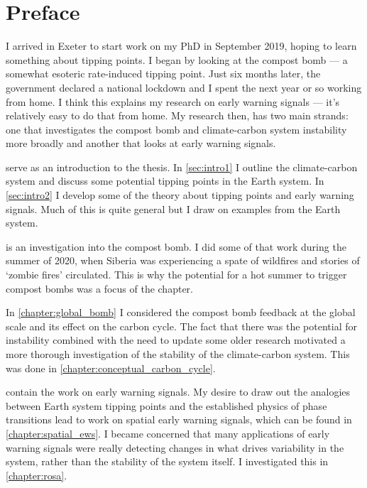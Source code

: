 \chapter{Preface}

I arrived in Exeter to start work on my PhD in September 2019, hoping to learn something about tipping points. I began by looking at the compost
bomb --- a somewhat esoteric rate-induced tipping point. Just six months later, the government declared a national lockdown
and I spent the next year or so working from home. I think this explains my research on early warning signals --- it's relatively easy to
do that from home. My research then, has two main strands: one that investigates the compost bomb and climate-carbon system instability more broadly
and another that looks at early warning signals.

 serve as an introduction to the thesis. In \cref{sec:intro1} I outline the climate-carbon system and discuss some potential
tipping points in the Earth system. In \cref{sec:intro2} I develop some of the theory about tipping points and early warning signals. Much of this is
quite general but I draw on examples from the Earth system.

 is an investigation into the compost bomb. I did some of that work during the summer of 2020, when Siberia
was experiencing a spate of wildfires and stories of `zombie fires' circulated. This is why the potential for a hot summer to trigger compost bombs
was a focus of the chapter.

In \cref{chapter:global_bomb} I considered the compost bomb feedback at the global scale and its effect on the carbon cycle.
The fact that there was the potential for instability combined with the need to update some older research motivated a more thorough investigation of
the stability of the climate-carbon system. This was done in \cref{chapter:conceptual_carbon_cycle}.

 contain the work on early warning signals. My desire to draw out the analogies between Earth system
tipping points and the established physics of phase transitions lead to work on spatial early warning signals, which can be found in \cref{chapter:spatial_ews}.
I became concerned that many applications of early warning signals were really detecting changes in what drives variability in the system, rather than the stability
of the system itself. I investigated this in \cref{chapter:rosa}.

